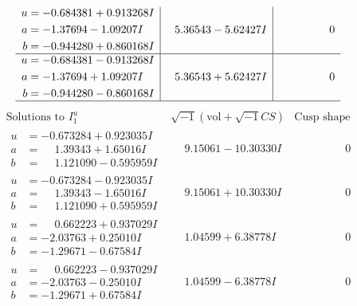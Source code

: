 \documentclass[1p]{elsarticle_modified}
\theoremstyle{definition}
\newcommand{\I}{\sqrt{-1}}
\begin{document}
$$\begin{array}{c|c|c}
\begin{aligned}
u &= -0.684381 + 0.913268 I \\
a &= -1.37694 - 1.09207 I \\
b &= -0.944280 + 0.860168 I\end{aligned}
 & \phantom{-}5.36543 - 5.62427 I & \phantom{-0.000000 } 0 \\ \hline\begin{aligned}
u &= -0.684381 - 0.913268 I \\
a &= -1.37694 + 1.09207 I \\
b &= -0.944280 - 0.860168 I\end{aligned}
 & \phantom{-}5.36543 + 5.62427 I & \phantom{-0.000000 } 0\\
 \hline 
 \end{array}$$\newpage$$\begin{array}{c|c|c}  
\text{Solutions to }I^u_{1}& \I (\text{vol} + \sqrt{-1}CS) & \text{Cusp shape}\\
 \hline 
\begin{aligned}
u &= -0.673284 + 0.923035 I \\
a &= \phantom{-}1.39343 + 1.65016 I \\
b &= \phantom{-}1.121090 - 0.595959 I\end{aligned}
 & \phantom{-}9.15061 - 10.30330 I & \phantom{-0.000000 } 0 \\ \hline\begin{aligned}
u &= -0.673284 - 0.923035 I \\
a &= \phantom{-}1.39343 - 1.65016 I \\
b &= \phantom{-}1.121090 + 0.595959 I\end{aligned}
 & \phantom{-}9.15061 + 10.30330 I & \phantom{-0.000000 } 0 \\ \hline\begin{aligned}
u &= \phantom{-}0.662223 + 0.937029 I \\
a &= -2.03763 + 0.25010 I \\
b &= -1.29671 - 0.67584 I\end{aligned}
 & \phantom{-}1.04599 + 6.38778 I & \phantom{-0.000000 } 0 \\ \hline\begin{aligned}
u &= \phantom{-}0.662223 - 0.937029 I \\
a &= -2.03763 - 0.25010 I \\
b &= -1.29671 + 0.67584 I\end{aligned}
 & \phantom{-}1.04599 - 6.38778 I & \phantom{-0.000000 } 0 \\ \hline\begin{aligned}

\end{aligned}
\end{array}$$
\end{document}
